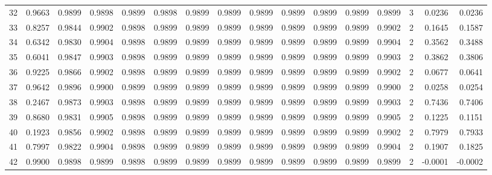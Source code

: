 \begin{tabular}{lrrrrrrrrrrrrrrr}
32  &      0.9663 &  0.9899 &  0.9898 &  0.9899 &  0.9898 &  0.9899 &  0.9899 &  0.9899 &  0.9899 &  0.9899 &   0.9899 &     0.9899 &      3 &                    0.0236 &                     0.0236 \\
33  &      0.8257 &  0.9844 &  0.9902 &  0.9898 &  0.9899 &  0.9899 &  0.9899 &  0.9899 &  0.9899 &  0.9899 &   0.9899 &     0.9902 &      2 &                    0.1645 &                     0.1587 \\
34  &      0.6342 &  0.9830 &  0.9904 &  0.9898 &  0.9899 &  0.9899 &  0.9899 &  0.9899 &  0.9899 &  0.9899 &   0.9899 &     0.9904 &      2 &                    0.3562 &                     0.3488 \\
35  &      0.6041 &  0.9847 &  0.9903 &  0.9898 &  0.9899 &  0.9899 &  0.9899 &  0.9899 &  0.9899 &  0.9899 &   0.9899 &     0.9903 &      2 &                    0.3862 &                     0.3806 \\
36  &      0.9225 &  0.9866 &  0.9902 &  0.9898 &  0.9899 &  0.9899 &  0.9899 &  0.9899 &  0.9899 &  0.9899 &   0.9899 &     0.9902 &      2 &                    0.0677 &                     0.0641 \\
37  &      0.9642 &  0.9896 &  0.9900 &  0.9899 &  0.9899 &  0.9899 &  0.9899 &  0.9899 &  0.9899 &  0.9899 &   0.9899 &     0.9900 &      2 &                    0.0258 &                     0.0254 \\
38  &      0.2467 &  0.9873 &  0.9903 &  0.9898 &  0.9899 &  0.9899 &  0.9899 &  0.9899 &  0.9899 &  0.9899 &   0.9899 &     0.9903 &      2 &                    0.7436 &                     0.7406 \\
39  &      0.8680 &  0.9831 &  0.9905 &  0.9898 &  0.9899 &  0.9899 &  0.9899 &  0.9899 &  0.9899 &  0.9899 &   0.9899 &     0.9905 &      2 &                    0.1225 &                     0.1151 \\
40  &      0.1923 &  0.9856 &  0.9902 &  0.9898 &  0.9899 &  0.9899 &  0.9899 &  0.9899 &  0.9899 &  0.9899 &   0.9899 &     0.9902 &      2 &                    0.7979 &                     0.7933 \\
41  &      0.7997 &  0.9822 &  0.9904 &  0.9898 &  0.9899 &  0.9899 &  0.9899 &  0.9899 &  0.9899 &  0.9899 &   0.9899 &     0.9904 &      2 &                    0.1907 &                     0.1825 \\
42  &      0.9900 &  0.9898 &  0.9899 &  0.9898 &  0.9899 &  0.9899 &  0.9899 &  0.9899 &  0.9899 &  0.9899 &   0.9899 &     0.9899 &      2 &                   -0.0001 &                    -0.0002 \\

\end{tabular}
